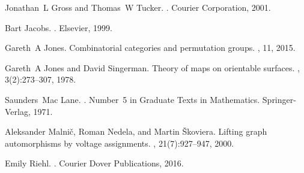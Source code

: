 \documentclass{amsart}
\theoremstyle{definition}
\begin{document}
\begin{thebibliography}{10}
Jonathan~L Gross and Thomas~W Tucker.
.
\newblock Courier Corporation, 2001.

Bart Jacobs.
.
\newblock Elsevier, 1999.

Gareth~A Jones.
\newblock Combinatorial categories and permutation groups.
, 11, 2015.

Gareth~A Jones and David Singerman.
\newblock Theory of maps on orientable surfaces.
, 3(2):273--307,
  1978.

Saunders~Mac Lane.
.
\newblock Number~5 in Graduate Texts in Mathematics. Springer-Verlag, 1971.

Aleksander Malni{\v{c}}, Roman Nedela, and Martin {\v{S}}koviera.
\newblock Lifting graph automorphisms by voltage assignments.
, 21(7):927--947, 2000.

Emily Riehl.
.
\newblock Courier Dover Publications, 2016.

\end{thebibliography}
\end{document}
